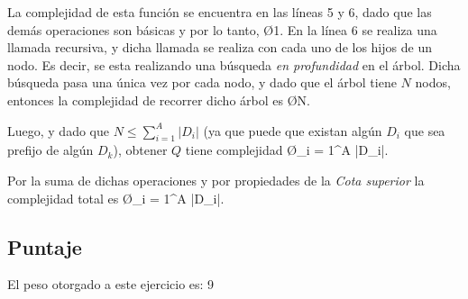 La complejidad de esta función se encuentra en las líneas 5 y 6, dado que las demás operaciones son básicas y por lo tanto, \O{1}.
En la línea 6 se realiza una llamada recursiva, y dicha llamada se realiza con cada uno de los hijos de un nodo. Es decir, se esta realizando una búsqueda \emph{en profundidad} en el árbol.
Dicha búsqueda pasa una única vez por cada nodo, y dado que el árbol tiene $N$ nodos, entonces la complejidad de recorrer dicho árbol es \O{N}.

Luego, y dado que $N \leq \displaystyle \sum_{i = 1}^{A} |D_i|$ (ya que puede que existan algún $D_i$ que sea prefijo de algún $D_k$), obtener $Q$ tiene complejidad \O{\displaystyle \sum_{i = 1}^{A} |D_i|}.

Por la suma de dichas operaciones y por propiedades de la \emph{Cota superior} la complejidad total es \O{\displaystyle \sum_{i = 1}^{A} |D_i|}.

\subsection{Puntaje}
El peso otorgado a este ejercicio es: 9
